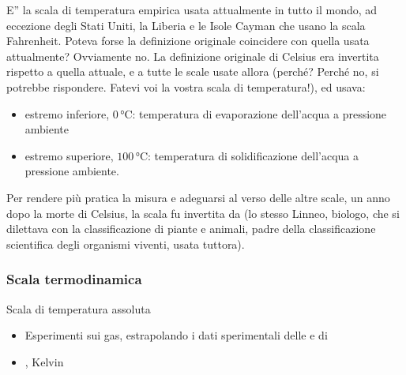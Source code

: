 \documentclass[letterpaper,10pt,italian]{jupyterBook}
\begin{document}
\sphinxAtStartPar
{} E” la scala di temperatura empirica usata attualmente in tutto il mondo, ad eccezione degli Stati Uniti, la Liberia e le Isole Cayman che usano la scala Fahrenheit. Poteva forse la definizione originale coincidere con quella usata attualmente? Ovviamente no. La definizione originale di Celsius era invertita rispetto a quella attuale, e a tutte le scale usate allora (perché? Perché no, si potrebbe rispondere. Fatevi voi la vostra scala di temperatura!), ed usava:
\begin{itemize}
\item {} 
\sphinxAtStartPar
estremo inferiore, \(0 \, \text{°C}\): temperatura di evaporazione dell’acqua a pressione ambiente

\item {} 
\sphinxAtStartPar
estremo superiore, \(100 \, \text{°C}\): temperatura di solidificazione dell’acqua a pressione ambiente.

\end{itemize}

\sphinxAtStartPar
Per rendere più pratica la misura e adeguarsi al verso delle altre scale, un anno dopo la morte di Celsius, la scala fu invertita da  (lo stesso Linneo, biologo, che si dilettava con la classificazione di piante e animali, padre della classificazione scientifica degli organismi viventi, usata tuttora).


\subsubsection{Scala termodinamica}
\label{\detokenize{ch/thermodynamics/foundation-experiments:scala-termodinamica}}\label{\detokenize{ch/thermodynamics/foundation-experiments:physics-hs-thermodynamics-foundation-experiments-t-scales-td}}
\sphinxAtStartPar
Scala di temperatura assoluta
\begin{itemize}
\item {} 
\sphinxAtStartPar
 Esperimenti sui gas, estrapolando i dati sperimentali delle {\hyperref[\detokenize{ch/thermodynamics/ideal-gas-experiments:physics-hs-thermodynamics-matter-gases-ideal-experiments-charles}]{}} e di {\hyperref[\detokenize{ch/thermodynamics/ideal-gas-experiments:physics-hs-thermodynamics-matter-gases-ideal-experiments-gay-lussac}]{}}

\item {} 
, Kelvin 

\end{itemize}
\end{document}
